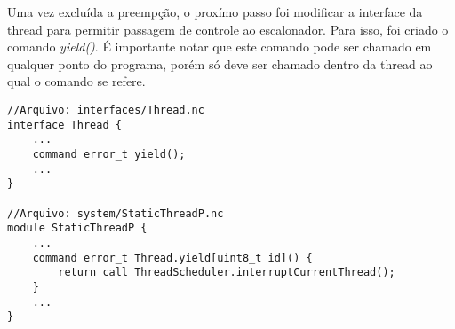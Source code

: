 Uma vez excluída a preempção, o proxímo passo foi modificar a interface da thread para permitir passagem de controle ao
escalonador. Para isso, foi criado o comando \textit{yield()}. É importante notar que este comando pode ser chamado em 
qualquer ponto do programa, porém só deve ser chamado dentro da thread ao qual o comando se refere.
\begin{lstlisting}
//Arquivo: interfaces/Thread.nc
interface Thread {
    ...
    command error_t yield();
    ...
}

//Arquivo: system/StaticThreadP.nc
module StaticThreadP {
    ...
    command error_t Thread.yield[uint8_t id]() { 
        return call ThreadScheduler.interruptCurrentThread(); 
    } 
    ...
}
\end{lstlisting}



